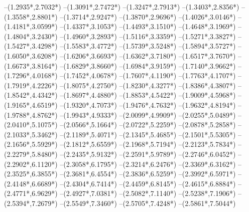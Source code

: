 {	--({1.2935*\dx},{2.7032*\dy})
	--({1.3091*\dx},{2.7472*\dy})
	--({1.3247*\dx},{2.7913*\dy})
	--({1.3403*\dx},{2.8356*\dy})
	--({1.3558*\dx},{2.8801*\dy})
	--({1.3714*\dx},{2.9247*\dy})
	--({1.3870*\dx},{2.9696*\dy})
	--({1.4026*\dx},{3.0146*\dy})
	--({1.4181*\dx},{3.0599*\dy})
	--({1.4337*\dx},{3.1053*\dy})
	--({1.4493*\dx},{3.1510*\dy})
	--({1.4648*\dx},{3.1969*\dy})
	--({1.4804*\dx},{3.2430*\dy})
	--({1.4960*\dx},{3.2893*\dy})
	--({1.5116*\dx},{3.3359*\dy})
	--({1.5271*\dx},{3.3827*\dy})
	--({1.5427*\dx},{3.4298*\dy})
	--({1.5583*\dx},{3.4772*\dy})
	--({1.5739*\dx},{3.5248*\dy})
	--({1.5894*\dx},{3.5727*\dy})
	--({1.6050*\dx},{3.6208*\dy})
	--({1.6206*\dx},{3.6693*\dy})
	--({1.6362*\dx},{3.7180*\dy})
	--({1.6517*\dx},{3.7670*\dy})
	--({1.6673*\dx},{3.8164*\dy})
	--({1.6829*\dx},{3.8660*\dy})
	--({1.6984*\dx},{3.9159*\dy})
	--({1.7140*\dx},{3.9662*\dy})
	--({1.7296*\dx},{4.0168*\dy})
	--({1.7452*\dx},{4.0678*\dy})
	--({1.7607*\dx},{4.1190*\dy})
	--({1.7763*\dx},{4.1707*\dy})
	--({1.7919*\dx},{4.2226*\dy})
	--({1.8075*\dx},{4.2750*\dy})
	--({1.8230*\dx},{4.3277*\dy})
	--({1.8386*\dx},{4.3807*\dy})
	--({1.8542*\dx},{4.4342*\dy})
	--({1.8697*\dx},{4.4880*\dy})
	--({1.8853*\dx},{4.5422*\dy})
	--({1.9009*\dx},{4.5968*\dy})
	--({1.9165*\dx},{4.6519*\dy})
	--({1.9320*\dx},{4.7073*\dy})
	--({1.9476*\dx},{4.7632*\dy})
	--({1.9632*\dx},{4.8194*\dy})
	--({1.9788*\dx},{4.8762*\dy})
	--({1.9943*\dx},{4.9333*\dy})
	--({2.0099*\dx},{4.9909*\dy})
	--({2.0255*\dx},{5.0489*\dy})
	--({2.0410*\dx},{5.1075*\dy})
	--({2.0566*\dx},{5.1664*\dy})
	--({2.0722*\dx},{5.2259*\dy})
	--({2.0878*\dx},{5.2858*\dy})
	--({2.1033*\dx},{5.3462*\dy})
	--({2.1189*\dx},{5.4071*\dy})
	--({2.1345*\dx},{5.4685*\dy})
	--({2.1501*\dx},{5.5305*\dy})
	--({2.1656*\dx},{5.5929*\dy})
	--({2.1812*\dx},{5.6559*\dy})
	--({2.1968*\dx},{5.7194*\dy})
	--({2.2123*\dx},{5.7834*\dy})
	--({2.2279*\dx},{5.8480*\dy})
	--({2.2435*\dx},{5.9132*\dy})
	--({2.2591*\dx},{5.9789*\dy})
	--({2.2746*\dx},{6.0452*\dy})
	--({2.2902*\dx},{6.1120*\dy})
	--({2.3058*\dx},{6.1795*\dy})
	--({2.3214*\dx},{6.2476*\dy})
	--({2.3369*\dx},{6.3162*\dy})
	--({2.3525*\dx},{6.3855*\dy})
	--({2.3681*\dx},{6.4554*\dy})
	--({2.3836*\dx},{6.5259*\dy})
	--({2.3992*\dx},{6.5971*\dy})
	--({2.4148*\dx},{6.6689*\dy})
	--({2.4304*\dx},{6.7414*\dy})
	--({2.4459*\dx},{6.8145*\dy})
	--({2.4615*\dx},{6.8884*\dy})
	--({2.4771*\dx},{6.9629*\dy})
	--({2.4927*\dx},{7.0381*\dy})
	--({2.5082*\dx},{7.1140*\dy})
	--({2.5238*\dx},{7.1906*\dy})
	--({2.5394*\dx},{7.2679*\dy})
	--({2.5549*\dx},{7.3460*\dy})
	--({2.5705*\dx},{7.4248*\dy})
	--({2.5861*\dx},{7.5044*\dy})
}
